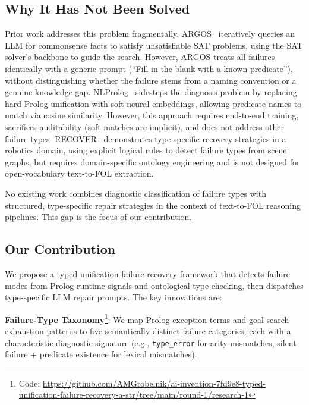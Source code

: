 \documentclass[11pt,letterpaper]{article}
\begin{document}
\subsection{Why It Has Not Been Solved}

Prior work addresses this problem fragmentally. ARGOS~\citep{Cotnareanu2026} iteratively queries an LLM for commonsense facts to satisfy unsatisfiable SAT problems, using the SAT solver's backbone to guide the search. However, ARGOS treats all failures identically with a generic prompt (``Fill in the blank with a known predicate''), without distinguishing whether the failure stems from a naming convention or a genuine knowledge gap. NLProlog~\citep{Weber2019} sidesteps the diagnosis problem by replacing hard Prolog unification with soft neural embeddings, allowing predicate names to match via cosine similarity. However, this approach requires end-to-end training, sacrifices auditability (soft matches are implicit), and does not address other failure types. RECOVER~\citep{Cornelio2024} demonstrates type-specific recovery strategies in a robotics domain, using explicit logical rules to detect failure types from scene graphs, but requires domain-specific ontology engineering and is not designed for open-vocabulary text-to-FOL extraction.

No existing work combines diagnostic classification of failure types with structured, type-specific repair strategies in the context of text-to-FOL reasoning pipelines. This gap is the focus of our contribution.

\subsection{Our Contribution}

We propose a typed unification failure recovery framework that detects failure modes from Prolog runtime signals and ontological type checking, then dispatches type-specific LLM repair prompts. The key innovations are:

\textbf{Failure-Type Taxonomy}\footnote{Code: \url{https://github.com/AMGrobelnik/ai-invention-7fd9e8-typed-unification-failure-recovery-a-str/tree/main/round-1/research-1}}: We map Prolog exception terms and goal-search exhaustion patterns to five semantically distinct failure categories, each with a characteristic diagnostic signature (e.g., \texttt{type\_error} for arity mismatches, silent failure + predicate existence for lexical mismatches).
\end{document}

